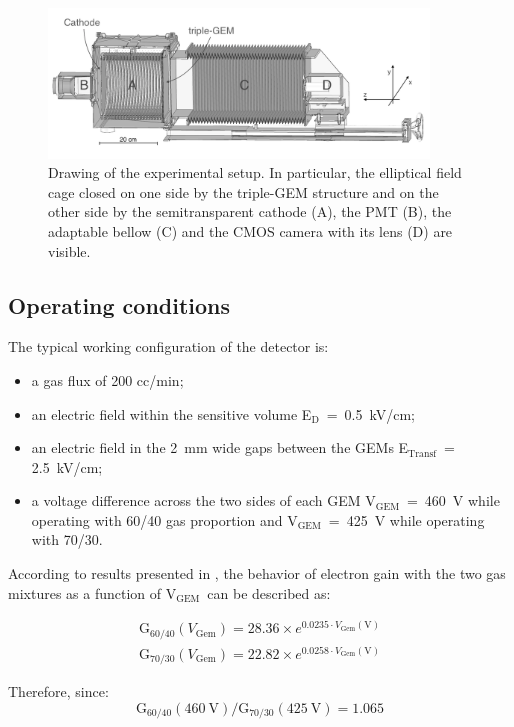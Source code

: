 \documentclass[a4paper,11pt]{article}
\newcommand{\Ed}  {E$_{\mathrm{D}}$}
\newcommand{\Et}  {E$_{\mathrm{Transf}}$}
\newcommand{\Vg}  {V$_{\mathrm{GEM}}$}
\begin{document}
\begin{figure}[ht]
\centering
\includegraphics[width=0.9\textwidth]{Figures/lemon.png}
\caption{Drawing of the experimental setup. In particular, the elliptical field cage closed on one side by the triple-GEM structure and on the other side by the semitransparent cathode (A), the PMT (B), the adaptable bellow (C) and the CMOS camera with its lens (D) are visible.} \label{fig:lemon}
\end{figure}

\subsection{Operating conditions}
\label{sec:oper}
The typical working configuration of the detector is: 
\begin{itemize}
    \item a gas flux of 200 cc/min;
    \item an electric field within the sensitive volume \Ed~=~0.5~kV/cm;
    \item an electric field in the 2~mm wide gaps between the GEMs \Et~= 2.5~kV/cm;
    \item a voltage difference across the two sides of each GEM \Vg~=~460~V while operating with 60/40 gas proportion and \Vg~=~425~V while operating with 70/30.
\end{itemize}

According to results presented in \cite{bib:roby}, the behavior of electron gain with
the two gas mixtures as a function of \Vg\ can be described as:

\begin{eqnarray}
    {\mathrm{G}}_{60/40} (V_{\mathrm{Gem}}) = 28.36 \times e^{0.0235 \cdot V_{\mathrm{Gem}}\mathrm{(V)}} \\
    {\mathrm{G}}_{70/30} (V_{\mathrm{Gem}}) = 22.82 \times e^{0.0258 \cdot V_{\mathrm{Gem}}\mathrm{(V)}}
\end{eqnarray}

Therefore, since:
\begin{equation}
{\mathrm{G}}_{60/40}(460~\mathrm{V})/{\mathrm{G}}_{70/30}(425~\mathrm{V}) = 1.065
\end{equation}
\end{document}
